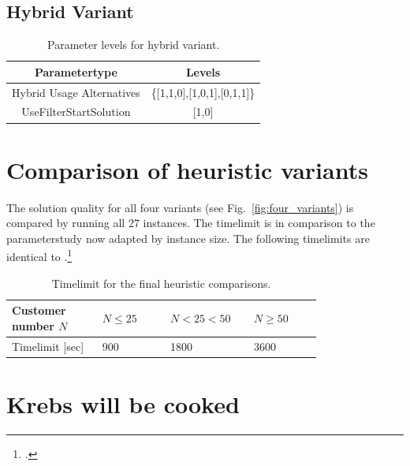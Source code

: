 \subsection{Hybrid Variant}
\label{subsec_parameterStuy_hybrid}

\begin{table}[ht]
    \centering
    \begin{tabular}{c c }
        \toprule
        Parametertype             & Levels                      \\
        \midrule
        Hybrid Usage Alternatives & \{[1,1,0],[1,0,1],[0,1,1]\} \\
        UseFilterStartSolution    & [1,0]                       \\
        \bottomrule
    \end{tabular}
    \caption{Parameter levels for hybrid variant.}
    \label{tab:parameters_hybrid}
\end{table}

\section{Comparison of heuristic variants}
\label{sec:comparison_ils_variants}

The solution quality for all four variants (see Fig.~\ref{fig:four_variants}) is compared by running all 27 instances.
The timelimit is in comparison to the parameterstudy now adapted by instance size. The following timelimits are identical
to \cite{zhang_evolutionary_2015}.\footcite[cf.][p.28]{zhang_evolutionary_2015}
\begin{table}[ht]
    \centering
    \begin{tabular}{C{0.24\linewidth}C{0.18\linewidth}C{0.18\linewidth}C{0.18\linewidth}}
        \toprule
        Customer number $N$ & $N \leq 25$ & $N < 25 < 50 $ & $N \geq 50 $ \\
        \midrule
        Timelimit [sec]     & 900         & 1800           & 3600         \\
        \bottomrule
    \end{tabular}
    \caption{Timelimit for the final heuristic comparisons.}
\end{table}

\section{Krebs will be cooked}
\label{sec:application_krebs}